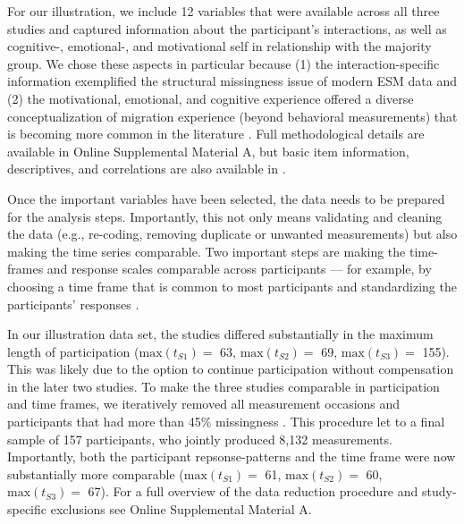 For our illustration, we include 12 variables that were available across
all three studies and captured information about the participant's
interactions, as well as cognitive-, emotional-, and motivational self
in relationship with the majority group. We chose these aspects in
particular because (1) the interaction-specific information exemplified
the structural missingness issue of modern ESM data and (2) the
motivational, emotional, and cognitive experience offered a diverse
conceptualization of migration experience (beyond behavioral
measurements) that is becoming more common in the literature
\citep[][]{Kreienkamp2022d}. Full methodological details are available
in Online Supplemental Material A, but basic item information,
descriptives, and correlations are also available in
.

Once the important variables have been selected, the data needs to be
prepared for the analysis steps. Importantly, this not only means
validating and cleaning the data (e.g., re-coding, removing duplicate or
unwanted measurements) but also making the time series comparable. Two
important steps are making the time-frames and response scales
comparable across participants --- for example, by choosing a time frame
that is common to most participants and standardizing the participants'
responses \citep{liao2005}.

In our illustration data set, the studies differed substantially in the
maximum length of participation (\(\text{max}(t_{S1})=\) 63,
\(\text{max}(t_{S2})=\) 69, \(\text{max}(t_{S3})=\) 155). This was
likely due to the option to continue participation without compensation
in the later two studies. To make the three studies comparable in
participation and time frames, we iteratively removed all measurement
occasions and participants that had more than 45\% missingness
\citep[which was in line with the general rcecommendation for data that might still need to rely on imputations for later model testing][]{Madley-Dowd2019}.
This procedure let to a final sample of 157 participants, who jointly
produced 8,132 measurements. Importantly, both the participant
repsonse-patterns and the time frame were now substantially more
comparable (\(\text{max}(t_{S1})=\) 61, \(\text{max}(t_{S2})=\) 60,
\(\text{max}(t_{S3})=\) 67). For a full overview of the data reduction
procedure and study-specific exclusions see Online Supplemental Material
A.


